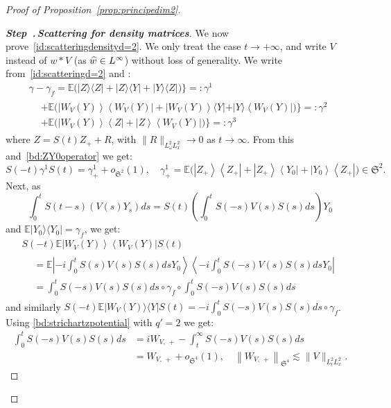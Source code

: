 \documentclass[AHL, Unicode, longabstracts,published]{cedram}
\newcommand{\E}{\mathbb{E}}
\newcommand{\frkS}{\mathfrak{S}}
\newcounter{stepcount}
\newenvironment{step}[1]{\refstepcounter{stepcount}\begin{proof}[{\bf{Step~\thestepcount}{.\,\emph{#1}}}]}{\let\qed\relax\end{proof}}
\let\oldhat\hat
\renewcommand*{\hat}[1]{\mathchoice{\widehat{#1}}{\widehat{#1}}{\oldhat{#1}}{\oldhat{#1}}}
\begin{document}
\begin{proof}[{Proof of Proposition~\ref{prop:principedim2}}]
\begin{step}{{Scattering for density matrices}}
We now prove~\eqref{id:scatteringdensityd=2}. We only treat the case $t\rightarrow +\infty$, and write $V$ instead of $w*V$ (as $\hat w\in L^\infty$) without loss of generality. We write from~\eqref{id:scatteringd=2} and :
\begin{multline*}
\gamma-\gamma_f = \E\big(|Z\rangle \langle Z |+|Z\rangle \langle Y|+|Y \rangle \langle Z|\big) \big\}=:\gamma^1\\
\begin{aligned}
&+\E\big(\left|W_{V}(Y)\right\rangle \left\langle W_{V}(Y)\right| +\left|W_{V}(Y)\right\rangle \langle Y|+|Y \rangle \left\langle W_{V}(Y)\right|\big) \big\}=:\gamma^2\\
&+\E\big(\left|W_{V}(Y)\right\rangle \left\langle Z \right|+ \left|Z \right\rangle \left\langle W_{V}(Y)\right|\big)\big\}=:\gamma^3
\end{aligned}
\end{multline*}
where $Z=S(t)Z_++R$, with $\| R \|_{L^2_\omega L^2_x}\rightarrow 0$ as $t\rightarrow \infty$. From this and~\eqref{bd:ZY0operator} we get:
\[
S(-t)\gamma^1S(t)=\gamma^1_+ +o_{\frkS^2}(1), \quad \gamma^1_+=\E\big(\left|Z_+\right\rangle \left\langle Z_+ \right|+\left|Z_+\right\rangle \left\langle Y_0\right|+\left|Y_0 \right\rangle \left\langle Z_+\right|\big)\in \frkS^2.
\]
Next, as 
\[
\int_0^t S(t-s)(V(s)Y_s)ds=S(t)\left(\int_0^t S(-s)V(s)S(s)ds\right)Y_0
\]
and $\E |Y_0\rangle \langle Y_0|=\gamma_f$, we get:
\begin{multline*}
S(-t)\E \left|W_{V}(Y)\right\rangle \left\langle W_{V}(Y)\right|S(t)\\
\begin{aligned}
&=\E \left| -i \int_0^t S(s)V(s)S(s)ds Y_0\right\rangle \left\langle-i \int_0^t S(-s)V(s)S(s)ds Y_0\right|\\
& =\int_0^t S(-s)V(s)S(s)ds \circ \gamma_f \circ \int_0^t S(-s)V(s)S(s)ds
\end{aligned}
\end{multline*}
and similarly $S(-t)\E |W_{V}(Y)\rangle \langle Y|S(t)=-i\int_0^t S(-s)V(s)S(s)ds \circ \gamma_f $. Using \eqref{bd:strichartzpotential} with $q'=2$ we get:
\begin{align*}
\int_0^t S(-s)V(s)S(s)ds &=iW_{V,\,+}-\int_t^\infty S(-s)V(s)S(s)ds \\
&=W_{V,\,+}+o_{\frkS^4}(1), \quad \left\|W_{V,\,+}\right\|_{\frkS^4}\lesssim \| V \|_{L^2_tL^2_x}.
\end{align*}

\end{step}
\end{proof}
\end{document}
